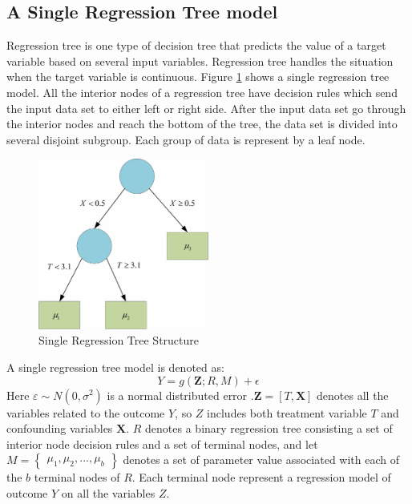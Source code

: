\subsection{A Single Regression Tree model}\label{IIIA}
Regression tree is one type of decision tree that predicts the value of a target variable based on several input variables. Regression tree handles the situation when the target variable is continuous. Figure \ref{singlergt} shows a single regression tree model. All the interior nodes of a regression tree have decision rules which send the input data set to either left or right side. After the input data set go through the interior nodes and reach the bottom of the tree, the data set is divided into several disjoint subgroup. Each group of data is represent by a leaf node. 

\begin{figure}[!thpb]
\centering
\includegraphics[width=0.5\textwidth]{chapter4_SingleRGT.pdf}
\caption{Single Regression Tree Structure}
\label{singlergt}
\end{figure}

A single regression tree model is denoted as:
\begin{equation*}
Y=g(\pmb{Z}; R, M)+\epsilon
\end{equation*}
Here $\varepsilon  \sim N(0,{\sigma ^2})$ is a normal distributed error .$\pmb{Z}=[T,\pmb{X}]$ denotes all the variables related to the outcome $Y$, so $Z$ includes both treatment variable $T$ and confounding variables $\pmb{X}$. $R$ denotes a binary regression tree consisting a set of interior node decision rules and a set of terminal nodes, and let $M=
\begin{Bmatrix}
 \mu _1, \mu _2, . . ., \mu _b 
\end{Bmatrix}$
denotes a set of parameter value associated with each of the $b$ terminal nodes of $R$. Each terminal node represent a regression model of outcome $Y$ on all the variables $Z$. 

